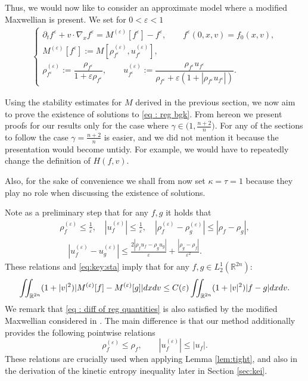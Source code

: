 \documentclass{amsart}
\theoremstyle{plain}
\theoremstyle{remark}
\numberwithin{equation}{section}
\newcommand{\p}{\partial}
\newcommand{\R}{\mathbb{R}}
\newcommand{\ve}{\varepsilon}
\newcommand{\dx}{\textnormal{d}x}
\newcommand{\dv}{\textnormal{d}v}
\begin{document}
Thus, we would now like to consider an approximate model where a modified Maxwellian is present. We set for $0<\ve<1$
\begin{align}
\label{eq : reg bgk}
    \begin{cases}
        \p_t f^\ve + v \cdot \nabla_x f^\ve = M^{(\ve)}[f^\ve] - f^\ve, \qquad f^\ve(0,x,v) = f_0(x,v),\\[6pt]
        M^{(\ve)}[f^\ve] := M\left[\rho_{f^\ve}^{(\ve)}, u_{f^\ve}^{(\ve)}\right],\\[6pt]
        \rho_{f^\ve}^{(\ve)} := \dfrac{\rho_{f^\ve}}{1 + \ve \rho_{f^\ve}}, \qquad u_{f^\ve}^{(\ve)} := \dfrac{\rho_{f^\ve}u_{f^\ve}}{\rho_{f^\ve} + \ve (1 + |\rho_{f^\ve}u_{f^\ve}|)}.
    \end{cases}
\end{align}

Using the stability estimates for $M$ derived in the previous section, we now aim to prove the existence of solutions to \eqref{eq : reg bgk}. From hereon we present proofs for our results only for the case where $\gamma \in \big(1,\frac{n+2}{n}\big)$. For any of the sections to follow the case $\gamma=\frac{n+2}{n}$ is easier, and we did not mention it because the presentation would become untidy. For example, we would have to repeatedly change the definition of $H(f,v)$.

Also, for the sake of convenience we shall from now set $\kappa = \tau =1$ because they play no role when discussing the existence of solutions.

Note as a preliminary step that for any $f,g$ it holds that
\begin{equation}
\label{eq : diff of reg quantities}
\begin{split}
\rho_{f}^{(\ve)} \le \frac{1}{\ve},\quad |u_{f}^{(\ve)}| \le \frac{1}{\ve},\quad|\rho_{f}^{(\ve)} - \rho^{(\ve)}_g| \le |\rho_f - \rho_g|,\\
 \quad |u^{(\ve)}_f - u^{(\ve)}_g| \le \frac{2|\rho_f u_f - \rho_g u_g|}{\ve} + \frac{|\rho_g - \rho_f|}{\ve^2}.
\end{split}
\end{equation}
These relations and \eqref{eq:key:sta} imply that for any $f,g\in L^1_2(\R^{2n})$:
\begin{align}
\label{eq : max f g stab}
    \iint_{\R^{2n}}(1+|v|^2)|M^{(\ve)}[f] - M^{(\ve)}[g]| \dx \dv \le C(\ve)\iint_{\R^{2n}} (1+|v|^2)|f - g| \dx \dv.
\end{align}
We remark that \eqref{eq : diff of reg quantities} is also satisfied by the modified Maxwellian considered in \cite{choihwang2024}. The main difference is that our method additionally provides the following pointwise relations 
\begin{equation}\label{eq:keydif}
\rho_{f}^{(\ve)} \le \rho_f, \quad \quad |u_{f}^{(\ve)}|\le |u_{f}| .
\end{equation}
These relations are crucially used when applying Lemma \ref{lem:tight}, and also in the derivation of the kinetic entropy inequality later in Section \ref{sec:kei}.
\end{document}
